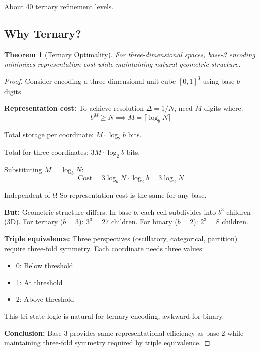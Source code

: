 \documentclass[twocolumn,10pt]{article}
\newtheorem{theorem}{Theorem}[section]
\theoremstyle{definition}
\theoremstyle{remark}
\begin{document}
About 40 ternary refinement levels.

\subsection{Why Ternary?}

\begin{theorem}[Ternary Optimality]
\label{thm:ternary}
For three-dimensional spaces, base-3 encoding minimizes representation cost while maintaining natural geometric structure.
\end{theorem}

\begin{proof}
Consider encoding a three-dimensional unit cube $[0,1]^3$ using base-$b$ digits.

\vspace{0.2cm}
\noindent\textbf{Representation cost:} To achieve resolution $\Delta = 1/N$, need $M$ digits where:
\begin{equation}
b^M \geq N \implies M = \lceil \log_b N \rceil
\end{equation}

Total storage per coordinate: $M \cdot \log_2 b$ bits.

Total for three coordinates: $3M \cdot \log_2 b$ bits.

Substituting $M = \log_b N$:
\begin{equation}
\text{Cost} = 3 \log_b N \cdot \log_2 b = 3 \log_2 N
\end{equation}

Independent of $b$! So representation cost is the same for any base.

\vspace{0.2cm}
\noindent\textbf{But:} Geometric structure differs. In base $b$, each cell subdivides into $b^3$ children (3D). For ternary ($b=3$): $3^3 = 27$ children. For binary ($b=2$): $2^3 = 8$ children.

\vspace{0.2cm}
\noindent\textbf{Triple equivalence:} Three perspectives (oscillatory, categorical, partition) require three-fold symmetry. Each coordinate needs three values:
\begin{itemize}
\item 0: Below threshold
\item 1: At threshold
\item 2: Above threshold
\end{itemize}

This tri-state logic is natural for ternary encoding, awkward for binary.

\vspace{0.2cm}
\noindent\textbf{Conclusion:} Base-3 provides same representational efficiency as base-2 while maintaining three-fold symmetry required by triple equivalence.
\end{proof}
\end{document}
